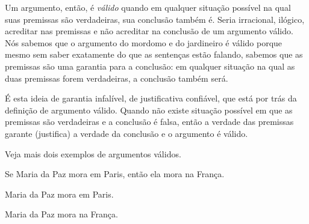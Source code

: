 Um argumento, então, é \emph{válido} quando em qualquer situação possível na qual suas premissas são verdadeiras, sua conclusão também é.
Seria irracional, ilógico, acreditar nas premissas e não acreditar na conclusão de um argumento válido.
Nós sabemos que o argumento do mordomo e do jardineiro é válido porque mesmo sem saber exatamente do que as sentenças estão falando, sabemos que as premissas são uma garantia para a conclusão:
em qualquer situação na qual as duas premissas forem verdadeiras, a conclusão também será.

É esta ideia de garantia infalível, de justificativa confiável, que está por trás da definição de argumento válido.
Quando não existe situação possível em que as premissas são verdadeiras e a conclusão é falsa, então a verdade das premissas garante (justifica) a verdade da conclusão e o argumento é válido.

Veja mais dois exemplos de argumentos válidos.
\begin{earg}\label{ValidoMaria}
	\item[] Se Maria da Paz mora em Paris, então ela mora na França.
	\item[] Maria da Paz mora em Paris.
	\item[\therefore] Maria da Paz mora na França.
\end{earg}

